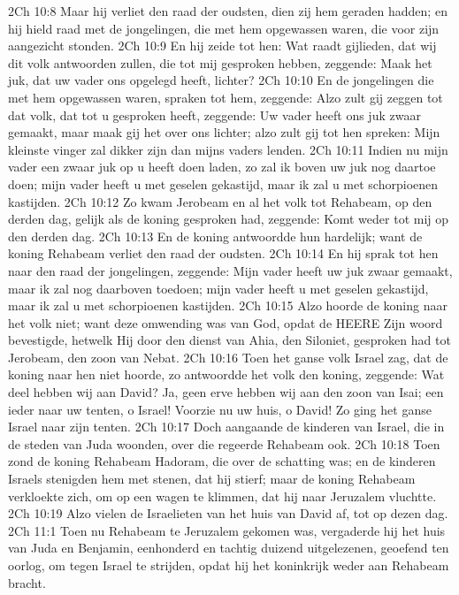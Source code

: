 2Ch 10:8  Maar hij verliet den raad der oudsten, dien zij hem geraden hadden; en hij hield raad met de jongelingen, die met hem opgewassen waren, die voor zijn aangezicht stonden.
2Ch 10:9  En hij zeide tot hen: Wat raadt gijlieden, dat wij dit volk antwoorden zullen, die tot mij gesproken hebben, zeggende: Maak het juk, dat uw vader ons opgelegd heeft, lichter?
2Ch 10:10  En de jongelingen die met hem opgewassen waren, spraken tot hem, zeggende: Alzo zult gij zeggen tot dat volk, dat tot u gesproken heeft, zeggende: Uw vader heeft ons juk zwaar gemaakt, maar maak gij het over ons lichter; alzo zult gij tot hen spreken: Mijn kleinste vinger zal dikker zijn dan mijns vaders lenden.
2Ch 10:11  Indien nu mijn vader een zwaar juk op u heeft doen laden, zo zal ik boven uw juk nog daartoe doen; mijn vader heeft u met geselen gekastijd, maar ik zal u met schorpioenen kastijden.
2Ch 10:12  Zo kwam Jerobeam en al het volk tot Rehabeam, op den derden dag, gelijk als de koning gesproken had, zeggende: Komt weder tot mij op den derden dag.
2Ch 10:13  En de koning antwoordde hun hardelijk; want de koning Rehabeam verliet den raad der oudsten.
2Ch 10:14  En hij sprak tot hen naar den raad der jongelingen, zeggende: Mijn vader heeft uw juk zwaar gemaakt, maar ik zal nog daarboven toedoen; mijn vader heeft u met geselen gekastijd, maar ik zal u met schorpioenen kastijden.
2Ch 10:15  Alzo hoorde de koning naar het volk niet; want deze omwending was van God, opdat de HEERE Zijn woord bevestigde, hetwelk Hij door den dienst van Ahia, den Siloniet, gesproken had tot Jerobeam, den zoon van Nebat.
2Ch 10:16  Toen het ganse volk Israel zag, dat de koning naar hen niet hoorde, zo antwoordde het volk den koning, zeggende: Wat deel hebben wij aan David? Ja, geen erve hebben wij aan den zoon van Isai; een ieder naar uw tenten, o Israel! Voorzie nu uw huis, o David! Zo ging het ganse Israel naar zijn tenten.
2Ch 10:17  Doch aangaande de kinderen van Israel, die in de steden van Juda woonden, over die regeerde Rehabeam ook.
2Ch 10:18  Toen zond de koning Rehabeam Hadoram, die over de schatting was; en de kinderen Israels stenigden hem met stenen, dat hij stierf; maar de koning Rehabeam verkloekte zich, om op een wagen te klimmen, dat hij naar Jeruzalem vluchtte.
2Ch 10:19  Alzo vielen de Israelieten van het huis van David af, tot op dezen dag.
2Ch 11:1  Toen nu Rehabeam te Jeruzalem gekomen was, vergaderde hij het huis van Juda en Benjamin, eenhonderd en tachtig duizend uitgelezenen, geoefend ten oorlog, om tegen Israel te strijden, opdat hij het koninkrijk weder aan Rehabeam bracht.
